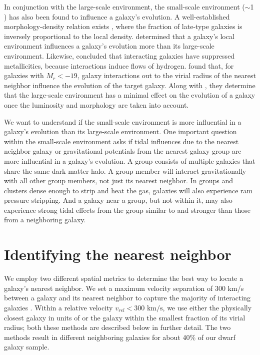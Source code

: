 In conjunction with the large-scale environment, the small-scale environment 
($\sim$1 \hMpc) has also been found to influence a galaxy's evolution.  A 
well-established morphology-density relation exists \citep{Dressler80}, where 
the fraction of late-type galaxies is inversely proportional to the local 
density.  \cite{Ellison09} determined that a galaxy's local environment 
influences a galaxy's evolution more than its large-scale environment.  
Likewise, \cite{Rupke08} concluded that interacting galaxies have suppressed 
metallicities, because interactions induce flows of hydrogen.  \cite{Park09} 
found that, for galaxies with $M_r < -19$, galaxy interactions out to the virial 
radius of the nearest neighbor influence the evolution of the target galaxy.  
Along with \cite{Park07}, they determine that the large-scale environment has a 
minimal effect on the evolution of a galaxy once the luminosity and morphology 
are taken into account.

We want to understand if the small-scale environment is more influential in a 
galaxy's evolution than its large-scale environment.  One important question 
within the small-scale environment asks if tidal influences due to the nearest 
neighbor galaxy or gravitational potentials from the nearest galaxy group are 
more influential in a galaxy's evolution.  A group consists of multiple galaxies 
that share the same dark matter halo.  A group member will interact 
gravitationally with all other group members, not just its nearest neighbor.  In 
groups and clusters dense enough to strip and heat the gas, galaxies will also 
experience ram pressure stripping.  And a galaxy near a group, but not within 
it, may also experience strong tidal effects from the group similar to and 
stronger than those from a neighboring galaxy.





\section[Nearest neighbor calculations]{Identifying the nearest neighbor}\label{sec:Theory_dist}

We employ two different spatial metrics to determine the best way to locate a 
galaxy's nearest neighbor.  We set a maximum velocity separation of 300 km/s 
between a galaxy and its nearest neighbor to capture the majority of interacting 
galaxies \citep[according to the distribution in peculiar velocity shown in][]
{Hwang10}.  Within a relative velocity $v_{rel} < 300\text{ km/s}$, we use 
either the physically closest galaxy in units of \hMpc or the galaxy within the 
smallest fraction of its virial radius; both these methods are described below 
in further detail.  The two methods result in different neighboring galaxies for 
about 40\% of our dwarf galaxy sample.


